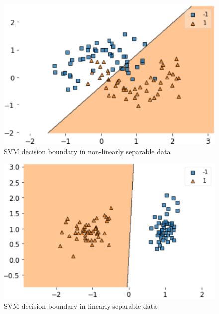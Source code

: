 \documentclass[10pt,onecolumn,letterpaper]{article}
\begin{document}
\begin{figure}[htb]
  \includegraphics[width=\linewidth]{svm_lin_non_sep.png}
  \caption{SVM decision boundary in non-linearly separable data}
  \label{fig:svm_exp_non_lin}
\end{figure}

\vspace{3.00mm} 

\begin{figure}[htb]
  \includegraphics[width=\linewidth]{svm_lin_sep.png}
  \caption{SVM decision boundary in linearly separable data}
  \label{fig:svm_exp_lin}
\end{figure}

\vspace{50.00mm} 
\end{document}
